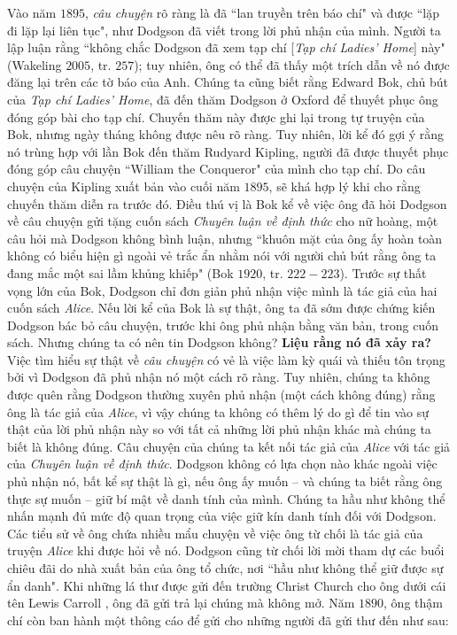 \begin{multicols}{2}
	Vào năm $1895$, \textit{câu chuyện} rõ ràng là đã ``lan truyền trên báo chí" và được ``lặp đi lặp lại liên tục", như Dodgson đã viết trong lời phủ nhận của mình. Người ta lập luận rằng ``không chắc Dodgson đã xem tạp chí [\textit{Tạp chí Ladies’ Home}] này" (Wakeling $2005$, tr. $257$); tuy nhiên, ông có thể đã thấy một trích dẫn về nó được đăng lại trên các tờ báo của Anh. Chúng ta cũng biết rằng Edward Bok, chủ bút của \textit{Tạp chí Ladies’ Home}, đã đến thăm Dodgson ở Oxford để thuyết phục ông đóng góp bài cho tạp chí. Chuyến thăm này được ghi lại trong tự truyện của Bok, nhưng ngày tháng không được nêu rõ ràng. Tuy nhiên, lời kể đó gợi ý rằng nó trùng hợp với lần Bok đến thăm Rudyard Kipling, người đã được thuyết phục đóng góp câu chuyện ``William the Conqueror" của mình cho tạp chí. Do câu chuyện của Kipling xuất bản vào cuối năm $1895$, sẽ khá hợp lý khi cho rằng chuyến thăm diễn ra trước đó. Điều thú vị là Bok kể về việc ông đã hỏi Dodgson về câu chuyện gửi tặng cuốn sách \textit{Chuyên luận về định thức} cho nữ hoàng, một câu hỏi mà Dodgson  không bình luận, nhưng ``khuôn mặt của ông ấy hoàn toàn không có biểu hiện gì ngoài vẻ trắc ẩn nhằm nói với người chủ bút rằng ông ta đang mắc một sai lầm khủng khiếp" (Bok $1920$, tr. $222-223$). Trước sự thất vọng lớn của Bok, Dodgson chỉ đơn giản  phủ nhận việc mình là tác giả của hai cuốn sách \textit{Alice}. Nếu lời kể của Bok là sự thật, ông ta đã sớm được chứng kiến Dodgson bác bỏ câu chuyện, trước khi ông phủ nhận bằng văn bản, trong cuốn sách. Nhưng chúng ta có nên tin Dodgson không?
	\vskip 0.1cm
	\textbf{\color{quantoan}Liệu rằng nó đã xảy ra?}
	\vskip 0.1cm
	Việc tìm hiểu sự thật về \textit{câu chuyện} có vẻ là việc làm kỳ quái và thiếu tôn trọng bởi vì Dodgson đã phủ nhận nó một cách rõ ràng. Tuy nhiên, chúng ta không được quên rằng Dodgson thường xuyên phủ nhận (một cách không đúng) rằng ông là tác giả của  \textit{Alice}, vì vậy chúng ta không có thêm lý do gì để tin vào sự thật của lời phủ nhận này so với tất cả những lời phủ nhận khác mà chúng ta biết là không đúng. Câu chuyện của chúng ta kết nối tác giả của \textit{Alice} với tác giả của \textit{Chuyên luận về định thức}. Dodgson không có lựa chọn nào khác ngoài việc phủ nhận nó, bất kể sự thật là gì, nếu ông ấy muốn -- và chúng ta biết rằng ông thực sự muốn -- giữ bí mật về danh tính của mình.
	\vskip 0.1cm
	Chúng ta hầu như không thể nhấn mạnh đủ mức độ quan trọng của việc giữ kín danh tính đối với Dodgson. Các tiểu sử về ông chứa nhiều mẩu chuyện về việc ông từ chối là tác giả của truyện \textit{Alice} khi được hỏi về nó. Dodgson cũng từ chối lời mời tham dự các buổi chiêu đãi do nhà xuất bản của ông tổ chức, nơi ``hầu như không thể giữ được sự ẩn danh". Khi những lá thư được gửi đến trường Christ Church cho ông dưới cái tên Lewis Carroll , ông  đã gửi trả lại chúng mà không mở. Năm $1890$, ông thậm chí còn ban hành một thông cáo để gửi cho những người đã gửi thư đến như sau:

\end{multicols}
